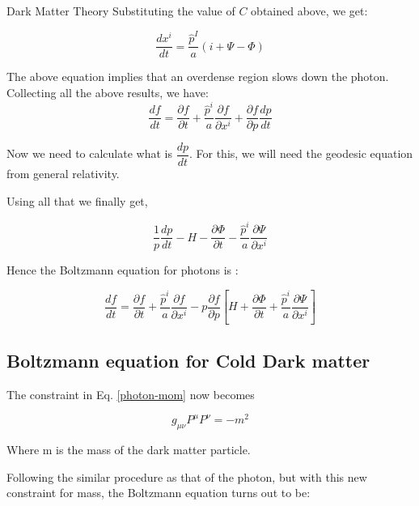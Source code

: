 \documentclass[10pt,a4paper]{book}
\begin{document}
\begin{chapter}{Dark Matter Theory}
		Substituting the value of $ C $ obtained above, we get:
		
		\begin{equation}\label{key}
		\dfrac{dx^i}{dt} = \dfrac{\hat{p}^I}{a}(i+\Psi - \Phi)
		\end{equation}
		
		The above equation implies that an overdense region slows down the photon. Collecting all the above results, we have:
		\begin{equation}\label{key}
		\dfrac{df}{dt} = \dfrac{\partial f}{\partial t } + \dfrac{\hat{p}^i}{a}\dfrac{\partial f}{\partial x^i } + \dfrac{\partial f}{\partial p } \dfrac{dp}{dt}
		\end{equation}
		
		Now we need to calculate what is $ \dfrac{dp}{dt} $. For this, we will need the geodesic equation from general relativity. 
		
		Using all that we finally get,
		
		\begin{equation}\label{key}
		\dfrac{1}{p} \dfrac{dp}{dt} -H -\dfrac{\partial \Phi}{\partial t }- \dfrac{\hat{p}^i}{a}\dfrac{\partial \Psi}{\partial x^i }
		\end{equation}
		
		Hence the Boltzmann equation for photons is : 
		
		\begin{equation}\label{key}
		\dfrac{df}{dt} = \dfrac{\partial f}{\partial t } + \dfrac{\hat{p}^i}{a}\dfrac{\partial f}{\partial x^i } - p\dfrac{\partial f}{\partial p }[H +\dfrac{\partial \Phi}{\partial t } + \dfrac{\hat{p}^i}{a}\dfrac{\partial \Psi}{\partial x^i }]
		\end{equation}
		
		\subsection{Boltzmann equation for Cold Dark matter}
		The constraint in Eq. \eqref{photon-mom} now becomes
		
		\begin{equation}\label{key}
		g_{\mu \nu} P^\mu P^\nu = -m^2
		\end{equation}
		
		Where m is the mass of the dark matter particle. 
		
		Following the similar procedure as that of the photon, but with this new constraint for mass, the Boltzmann equation turns out to be:
		

\end{chapter}
\end{document}
